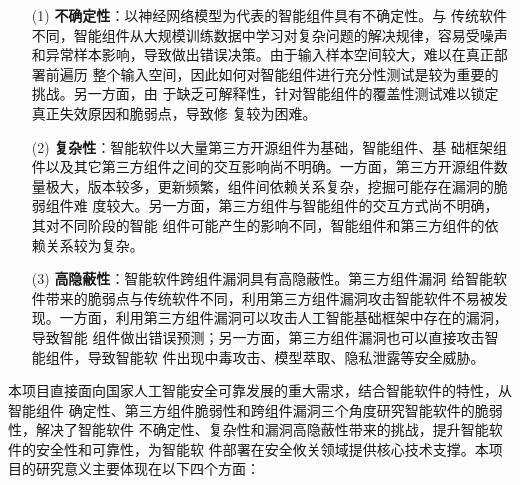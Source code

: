 \begin{itemize}
    \item[(1)]\textbf{不确定性}：以神经网络模型为代表的智能组件具有不确定性。与
    传统软件不同，智能组件从大规模训练数据中学习对复杂问题的解决规律，容易受噪声
    和异常样本影响，导致做出错误决策。由于输入样本空间较大，难以在真正部署前遍历
    整个输入空间，因此如何对智能组件进行充分性测试是较为重要的挑战。另一方面，由
    于缺乏可解释性，针对智能组件的覆盖性测试难以锁定真正失效原因和脆弱点，导致修
    复较为困难。
    \item[(2)]\textbf{复杂性}：智能软件以大量第三方开源组件为基础，智能组件、基
    础框架组件以及其它第三方组件之间的交互影响尚不明确。一方面，第三方开源组件数
    量极大，版本较多，更新频繁，组件间依赖关系复杂，挖掘可能存在漏洞的脆弱组件难
    度较大。另一方面，第三方组件与智能组件的交互方式尚不明确，其对不同阶段的智能
    组件可能产生的影响不同，智能组件和第三方组件的依赖关系较为复杂。
    \item[(3)]\textbf{高隐蔽性}：智能软件跨组件漏洞具有高隐蔽性。第三方组件漏洞
    给智能软件带来的脆弱点与传统软件不同，利用第三方组件漏洞攻击智能软件不易被发
    现。一方面，利用第三方组件漏洞可以攻击人工智能基础框架中存在的漏洞，导致智能
    组件做出错误预测；另一方面，第三方组件漏洞也可以直接攻击智能组件，导致智能软
    件出现中毒攻击、模型萃取、隐私泄露等安全威胁。
\end{itemize}


本项目直接面向国家人工智能安全可靠发展的重大需求，结合智能软件的特性，从智能组件
确定性、第三方组件脆弱性和跨组件漏洞三个角度研究智能软件的脆弱性，解决了智能软件
不确定性、复杂性和漏洞高隐蔽性带来的挑战，提升智能软件的安全性和可靠性，为智能软
件部署在安全攸关领域提供核心技术支撑。本项目的研究意义主要体现在以下四个方面：

